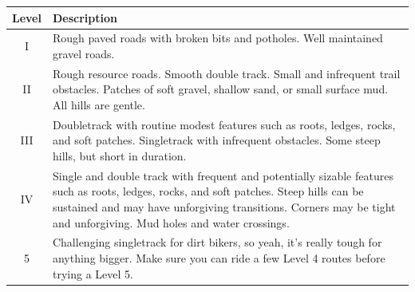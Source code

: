 \documentclass{article}
\begin{document}
\begin{minipage}[t]{0.9\linewidth}
    \begin{center}
        \begin{tabular}{|c|p{12cm}|}
            \hline
            \textbf{Level} & \textbf{Description}                                                                                                                                                                                                                                           \\
            \hline
            I              & Rough paved roads with broken bits and potholes. Well maintained gravel roads.                                                                                                                                                                                 \\
            \hline
            II             & Rough resource roads. Smooth double track. Small and infrequent trail obstacles. Patches of soft gravel, shallow sand, or small surface mud. All hills are gentle.                                                                                             \\
            \hline
            III            & Doubletrack with routine modest features such as roots, ledges, rocks, and soft patches. Singletrack with infrequent obstacles. Some steep hills, but short in duration.                                                                                       \\
            \hline
            IV             & Single and double track with frequent and potentially sizable features such as roots, ledges, rocks, and soft patches. Steep hills can be sustained and may have unforgiving transitions. Corners may be tight and unforgiving. Mud holes and water crossings. \\
            \hline
            \rowcolor{lightgrey}
            5              & Challenging singletrack for dirt bikers, so yeah, it’s really tough for anything bigger. Make sure you can ride a few Level 4 routes before trying a Level 5.                                                                                                  \\
            \hline
        \end{tabular}
    \end{center}
\end{minipage}
\end{document}
